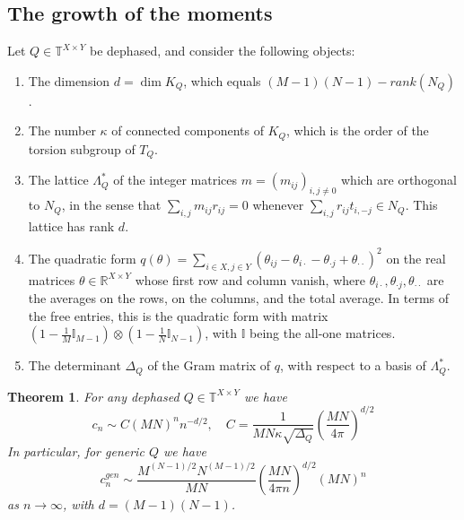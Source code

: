 \documentclass[11pt,reqno]{amsart}
\newtheorem{thm}{Theorem}[section]
\theoremstyle{definition}
\numberwithin{equation}{section}
\begin{document}
\subsection{The growth of the moments}

Let $Q\in\mathbb T^{X\times Y}$ be dephased, and consider the following objects:
\begin{enumerate}
\item The dimension $d=\dim K_Q$, which equals $(M-1)(N-1)-rank(N_Q)$.

\item The number $\kappa$ of connected components of $K_Q$, which is the order of the torsion subgroup of $T_Q$.

\item The lattice $\Lambda^*_Q$ of the integer matrices $m=(m_{ij})_{i,j\neq0}$ which are orthogonal to $N_Q$, in the sense that $\sum_{i,j}m_{ij}r_{ij}=0$ whenever $\sum_{i,j}r_{ij}t_{i,-j}\in N_Q$. This lattice has rank $d$.

\item The quadratic form $q(\theta)=\sum_{i\in X,j\in Y}(\theta_{ij}-\theta_{i\cdot}-\theta_{\cdot j}+\theta_{\cdot\cdot})^2$ on the real matrices $\theta\in\mathbb R^{X\times Y}$ whose first row and column vanish, where $\theta_{i\cdot},\theta_{\cdot j},\theta_{\cdot\cdot}$ are the averages on the rows, on the columns, and the total average. In terms of the free entries, this is the quadratic form with matrix $(1-\frac1M\mathbb I_{M-1})\otimes(1-\frac1N\mathbb I_{N-1})$, with $\mathbb I$ being the all-one matrices.

\item The determinant $\Delta_Q$ of the Gram matrix of $q$, with respect to a basis of $\Lambda_Q^*$.
\end{enumerate}

\begin{thm}\label{thm:growth}
For any dephased $Q\in\mathbb T^{X\times Y}$ we have
$$c_n\sim C(MN)^nn^{-d/2},\quad C=\frac1{MN\kappa\sqrt{\Delta_Q}}\left(\frac{MN}{4\pi}\right)^{d/2}$$
In particular, for generic $Q$ we have
$$c_n^{gen}\sim\frac{M^{(N-1)/2}N^{(M-1)/2}}{MN}\left(\frac{MN}{4\pi n}\right)^{d/2}(MN)^n$$
as $n\to\infty$, with $d=(M-1)(N-1)$.
\end{thm}
\end{document}
